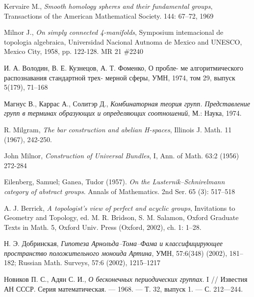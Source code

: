 \documentclass[14pt, dvipsnames]{extarticle}
\theoremstyle{definition}
\theoremstyle{remark}
\begin{document}
\begin{thebibliography}{}
Kervaire M., {\it Smooth homology spheres and their fundamental groups}, Transactions of the American Mathematical Society. 144: 67–72, 1969



Milnor J., {\it On simply connected 4-manifolds}, Symposium intemacional de topologia algebraica, Universidad Nacional Autnoma de Mexico and UNESCO, Mexico City, 1958, pp. 122-128. MR 21 \#2240



И. А. Володин, В. Е. Кузнецов, А. Т. Фоменко, О пробле- ме алгоритмического распознавания стандартной трех-
мерной сферы, УМН, 1974, том 29, выпуск 5(179), 71–168




Магнус В., Каррас А., Солитэр Д., {\it Комбинаторная теория групп. Представление групп в терминах образующих и определяющих соотношений}, М.: Наука, 1974.



R. Milgram, {\it The bar construction and abelian H-spaces}, Illinois J. Math. 11 (1967), 242-250.




John Milnor, {\it Construction of Universal Bundles}, I, Ann. of Math. 63:2 (1956) 272-284



Eilenberg, Samuel; Ganea, Tudor (1957). {\it On the Lusternik–Schnirelmann category of abstract groups}. Annals of Mathematics. 2nd Ser. 65 (3): 517–518



A. J. Berrick, {\it A topologist’s view of perfect and acyclic groups}, Invitations to Geometry and
Topology, ed. M. R. Bridson, S. M. Salamon, Oxford Graduate Texts in Math. 5, Oxford
Univ. Press (Oxford, 2002), ch. 1: 1–28.



Н. Э. Добринская, {\it Гипотеза Арнольда–Тома–Фама и классифицирующее пространство положительного моноида Артина}, УМН, 57:6(348) (2002), 181–182; Russian Math. Surveys, 57:6 (2002), 1215–1217 




Новиков П. С., Адян С. И., {\it О бесконечных периодических группах}. I // Известия АН СССР. Серия математическая. — 1968. — Т. 32, выпуск 1. — С. 212—244.






\end{thebibliography}
\end{document}
